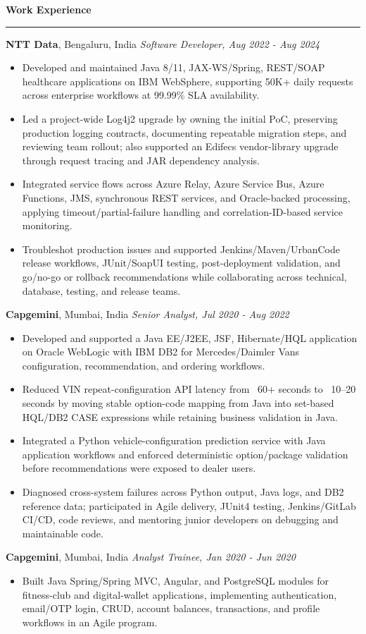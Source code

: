 \documentclass[10pt,letterpaper]{article}
\newcommand{\ressection}[1]{\vspace{3pt}\par\textbf{#1}\par\vspace{0.8pt}\hrule\vspace{1.7pt}}
\begin{document}
\ressection{Work Experience}
\textbf{NTT Data}, Bengaluru, India \hfill \textit{Software Developer, Aug 2022 - Aug 2024}
\begin{itemize}
  \item Developed and maintained Java 8/11, JAX-WS/Spring, REST/SOAP healthcare applications on IBM WebSphere, supporting 50K+ daily requests across enterprise workflows at 99.99\% SLA availability.
  \item Led a project-wide Log4j2 upgrade by owning the initial PoC, preserving production logging contracts, documenting repeatable migration steps, and reviewing team rollout; also supported an Edifecs vendor-library upgrade through request tracing and JAR dependency analysis.
  \item Integrated service flows across Azure Relay, Azure Service Bus, Azure Functions, JMS, synchronous REST services, and Oracle-backed processing, applying timeout/partial-failure handling and correlation-ID-based service monitoring.
  \item Troubleshot production issues and supported Jenkins/Maven/UrbanCode release workflows, JUnit/SoapUI testing, post-deployment validation, and go/no-go or rollback recommendations while collaborating across technical, database, testing, and release teams.
\end{itemize}
\textbf{Capgemini}, Mumbai, India \hfill \textit{Senior Analyst, Jul 2020 - Aug 2022}
\begin{itemize}
  \item Developed and supported a Java EE/J2EE, JSF, Hibernate/HQL application on Oracle WebLogic with IBM DB2 for Mercedes/Daimler Vans configuration, recommendation, and ordering workflows.
  \item Reduced VIN repeat-configuration API latency from ~60+ seconds to ~10--20 seconds by moving stable option-code mapping from Java into set-based HQL/DB2 CASE expressions while retaining business validation in Java.
  \item Integrated a Python vehicle-configuration prediction service with Java application workflows and enforced deterministic option/package validation before recommendations were exposed to dealer users.
  \item Diagnosed cross-system failures across Python output, Java logs, and DB2 reference data; participated in Agile delivery, JUnit4 testing, Jenkins/GitLab CI/CD, code reviews, and mentoring junior developers on debugging and maintainable code.
\end{itemize}
\textbf{Capgemini}, Mumbai, India \hfill \textit{Analyst Trainee, Jan 2020 - Jun 2020}
\begin{itemize}
  \item Built Java Spring/Spring MVC, Angular, and PostgreSQL modules for fitness-club and digital-wallet applications, implementing authentication, email/OTP login, CRUD, account balances, transactions, and profile workflows in an Agile program.
\end{itemize}
\end{document}
